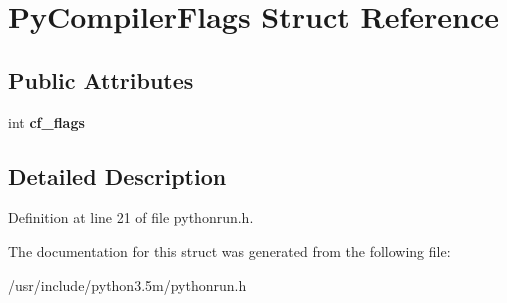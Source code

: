 \hypertarget{structPyCompilerFlags}{}\section{Py\+Compiler\+Flags Struct Reference}
\label{structPyCompilerFlags}
\subsection*{Public Attributes}
\begin{DoxyCompactItemize}
\item 
int {\bfseries cf\+\_\+flags}\hypertarget{structPyCompilerFlags_a5b23323cb0cc7f1c460991ccea5c0a3d}{}\label{structPyCompilerFlags_a5b23323cb0cc7f1c460991ccea5c0a3d}

\end{DoxyCompactItemize}


\subsection{Detailed Description}


Definition at line 21 of file pythonrun.\+h.



The documentation for this struct was generated from the following file\+:\begin{DoxyCompactItemize}
\item 
/usr/include/python3.\+5m/pythonrun.\+h\end{DoxyCompactItemize}
